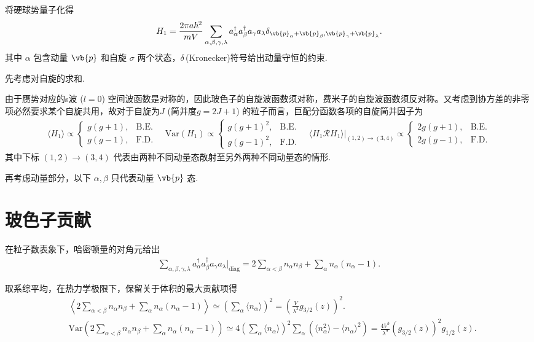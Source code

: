 将硬球势量子化得
\begin{align*}
	H_{1} = \frac{2\pi a \hbar^{2}}{m V} \sum_{\alpha,\beta,\gamma,\lambda} a_{\alpha}^{\dagger} a_{\beta}^{\dagger} a_{\gamma} a_{\lambda} \delta_{\vb{p}_{\alpha} + \vb{p}_{\beta}, \vb{p}_{\gamma} + \vb{p}_{\lambda}}.
\end{align*}
其中 \(\alpha\) 包含动量 \(\vb{p}\) 和自旋 \(\sigma\) 两个状态，\(\delta\,\)(Kronecker)符号给出动量守恒的约束.

先考虑对自旋的求和.

由于赝势对应的s波 (\(l = 0\)) 空间波函数是对称的，因此玻色子的自旋波函数须对称，费米子的自旋波函数须反对称。又考虑到协方差的非零项必然要求某个自旋共用，故对于自旋为\(J\) (简并度\(g = 2J + 1\)) 的粒子而言，巨配分函数各项的自旋简并因子为
\begin{align*}
	\langle H_{1} \rangle \propto
	\begin{cases}
		g(g+1), & \text{B.E.} \\
		g(g-1), & \text{F.D.}
	\end{cases}
	\quad \mathrm{Var}(H_{1}) \propto
	\begin{cases}
		g(g+1)^{2}, & \text{B.E.} \\
		g(g-1)^{2}, & \text{F.D.}
	\end{cases}\quad
	\langle H_{1} \mathcal{R} H_{1} \rangle \big|_{(1,2) \to (3,4)} \propto
	\begin{cases}
		2g(g+1), & \text{B.E.} \\
		2g(g-1), & \text{F.D.}
	\end{cases}
\end{align*}
其中下标 \((1,2) \to (3,4)\) 代表由两种不同动量态散射至另外两种不同动量态的情形.

再考虑动量部分，以下 \(\alpha, \beta\) 只代表动量 \(\vb{p}\) 态.

\section{玻色子贡献}

在粒子数表象下，哈密顿量的对角元给出
\begin{align*}
	\sum_{\alpha,\beta,\gamma,\lambda} a_{\alpha}^{\dagger} a_{\beta}^{\dagger} a_{\gamma} a_{\lambda} \Big|_{\text{diag}}= 2 \sum_{\alpha < \beta} n_{\alpha} n_{\beta} + \sum_{\alpha} n_{\alpha} (n_{\alpha} - 1).
\end{align*}

取系综平均，在热力学极限下，保留关于体积的最大贡献项得
\begin{align*}
	&\left\langle 2 \sum_{\alpha < \beta} n_{\alpha} n_{\beta} + \sum_{\alpha} n_{\alpha} (n_{\alpha} - 1) \right\rangle \simeq \left( \sum_{\alpha} \langle n_{\alpha} \rangle \right)^{2} = \left( \frac{V}{\lambda^{3}} g_{3/2}(z) \right)^{2}.\\
	&\mathrm{Var}\left( 2 \sum_{\alpha < \beta} n_{\alpha} n_{\beta} + \sum_{\alpha} n_{\alpha} (n_{\alpha} - 1) \right) \simeq 4 \left( \sum_{\alpha} \langle n_{\alpha} \rangle \right)^{2} \sum_{\alpha} \left( \langle n_{\alpha}^{2} \rangle - \langle n_{\alpha} \rangle^{2} \right) = \frac{4V^{3}}{\lambda^{9}} (g_{3/2}(z))^{2} g_{1/2}(z).
\end{align*}

